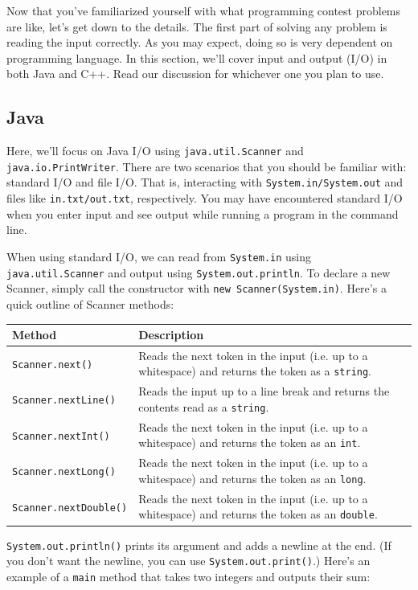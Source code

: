 Now that you've familiarized yourself with what programming contest problems are like, let's get down to the details. The first part of solving any problem is reading the input correctly. As you may expect, doing so is very dependent on programming language. In this section, we'll cover input and output (I/O) in both Java and C++. Read our discussion for whichever one you plan to use.

\subsection{Java}
Here, we'll focus on Java I/O using \texttt{java.util.Scanner} and \texttt{java.io.PrintWriter}. There are two scenarios that you should be familiar with: standard I/O and file I/O. That is, interacting with \texttt{System.in/System.out} and files like \texttt{in.txt/out.txt}, respectively. You may have encountered standard I/O when you enter input and see output while running a program in the command line.

When using standard I/O, we can read from \texttt{System.in} using \texttt{java.util.Scanner} and output using \texttt{System.out.println}. To declare a new Scanner, simply call the constructor with \texttt{new Scanner(System.in)}. Here's a quick outline of Scanner methods:
\begin{center}
  \begin{tabularx}{0.75\textwidth}{|l|X|}
    \hline
    Method & Description \\ \hline
    \texttt{Scanner.next()} & Reads the next token in the input (i.e. up to a whitespace) and returns the token as a \texttt{string}. \\ \hline
    \texttt{Scanner.nextLine()} & Reads the input up to a line break and returns the contents read as a \texttt{string}. \\ \hline
    \texttt{Scanner.nextInt()} & Reads the next token in the input (i.e. up to a whitespace) and returns the token as an \texttt{int}. \\ \hline
    \texttt{Scanner.nextLong()} & Reads the next token in the input (i.e. up to a whitespace) and returns the token as an \texttt{long}. \\ \hline
    \texttt{Scanner.nextDouble()} & Reads the next token in the input (i.e. up to a whitespace) and returns the token as an \texttt{double}. \\ \hline
  \end{tabularx}
\end{center}
\texttt{System.out.println()} prints its argument and adds a newline at the end. (If you don't want the newline, you can use \texttt{System.out.print()}.) Here's an example of a \texttt{main} method that takes two integers and outputs their sum:

